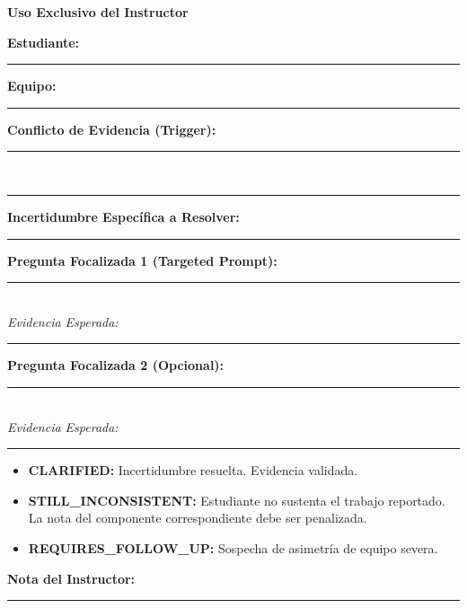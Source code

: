 \documentclass[11pt, a4paper]{article}
\begin{document}
\begin{tcolorbox}[colback=ucbblue!5!white, colframe=ucbblue, title=\textbf{Registro de Microdefensa Selectiva (Auditoría de Evidencia)}]
    \centering \textbf{Uso Exclusivo del Instructor}
\end{tcolorbox}

\textbf{Estudiante:} \rule{5cm}{0.4pt} \quad \textbf{Equipo:} \rule{3cm}{0.4pt}

\vspace{0.4cm}
\noindent\textbf{Conflicto de Evidencia (Trigger):} \\
\rule{\textwidth}{0.4pt} \\
\rule{\textwidth}{0.4pt}

\vspace{0.4cm}
\noindent\textbf{Incertidumbre Específica a Resolver:} \\
\rule{\textwidth}{0.4pt}

\vspace{0.4cm}
\noindent\textbf{Pregunta Focalizada 1 (Targeted Prompt):} \\
\rule{\textwidth}{0.4pt} \\
\textit{Evidencia Esperada:} \rule{12cm}{0.4pt}

\vspace{0.4cm}
\noindent\textbf{Pregunta Focalizada 2 (Opcional):} \\
\rule{\textwidth}{0.4pt} \\
\textit{Evidencia Esperada:} \rule{12cm}{0.4pt}

\vspace{0.6cm}
\begin{tcolorbox}[colback=gray!5, colframe=gray!50, title=\textbf{Resolución y Fallo (Máx. 3-5 minutos)}]
\begin{itemize}\setlength\itemsep{0.2em}
    \item[$\square$] \textbf{CLARIFIED:} Incertidumbre resuelta. Evidencia validada.
    \item[$\square$] \textbf{STILL\_INCONSISTENT:} Estudiante no sustenta el trabajo reportado. La nota del componente correspondiente debe ser penalizada.
    \item[$\square$] \textbf{REQUIRES\_FOLLOW\_UP:} Sospecha de asimetría de equipo severa.
\end{itemize}
\end{tcolorbox}

\noindent\textbf{Nota del Instructor:} \\
\rule{\textwidth}{0.4pt}
\end{document}

